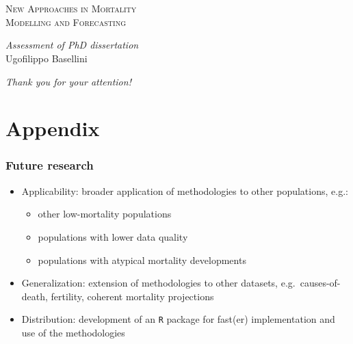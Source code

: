 \documentclass[12pt, xcolor=table]{beamer}  %
\begin{document}
\begin{frame}\frametitle{$\,$}
	\vspace{-1.5cm}
	\begin{center}
	\begin{Large}	
	{ \textsc{New Approaches in Mortality \\ Modelling and Forecasting} \\}
	\end{Large}
	\bigskip 
		\bigskip 

	\begin{large}
	{ \textit{Assessment of PhD dissertation}} \\
	\bigskip
				\bigskip 
	Ugofilippo Basellini 
	\end{large}	
	\bigskip
	\bigskip
	\bigskip
	
	\begin{large}	
	\textsl{Thank you for your attention!}
	\end{large}	
	\end{center}
	\bigskip
	\bigskip
	\bigskip
	
\end{frame}



\section*{Appendix}

\begin{frame}[noframenumbering]\frametitle{Future research}
	\begin{itemize}
		\setlength\itemsep{1.35em}
		\item {Applicability}:  broader application of methodologies to other populations, e.g.:
		\begin{itemize}
			\item other low-mortality populations
			\item populations with lower data quality
			\item populations with atypical mortality developments 
		\end{itemize}
		\item {Generalization}: extension of methodologies to other datasets, e.g.~causes-of-death, fertility, coherent mortality projections
		\item
		{Distribution}: development of an \texttt{R} package for fast(er) implementation and use of the methodologies
	\end{itemize}
\end{frame}
\end{document}
